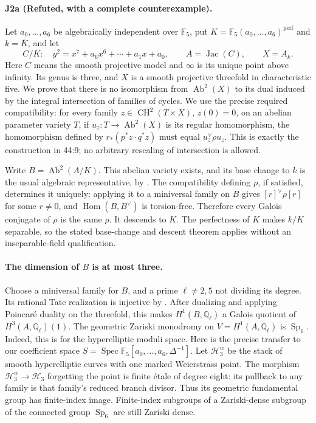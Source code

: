 \paragraph{J2a (Refuted, with a complete counterexample).}
Let $a_0,\ldots,a_6$ be algebraically independent over $\mathbb F_5$,
put $K=\mathbb F_5(a_0,\ldots,a_6)^{\mathrm{perf}}$ and
$k=\overline K$, and let
\[
 C/K:\quad y^2=x^7+a_6x^6+\cdots+a_1x+a_0,
 \qquad A=\operatorname{Jac}(C),\qquad X=A_k.
\]
Here $C$ means the smooth projective model and $\infty$ is its
unique point above infinity.  Its genus is three, and $X$ is a
smooth projective threefold in characteristic five.  We prove
that there is no isomorphism from $\operatorname{Ab}^2(X)$ to its
dual induced by the integral intersection of families of cycles.
We use the precise required compatibility: for every family
$z\in\operatorname{CH}^2(T\times X)$, $z(0)=0$, on an abelian
parameter variety $T$, if $u_z:T\to\operatorname{Ab}^2(X)$ is its
regular homomorphism, the homomorphism defined by
$r_*(p^*z\cdot q^*z)$ must equal $u_z^\vee\rho u_z$.
This is exactly the construction in 44:9; no arbitrary rescaling
of intersection is allowed.

Write $B=\operatorname{Ab}^2(A/K)$.  This abelian variety exists,
and its base change to $k$ is the usual algebraic representative,
by \cite[Theorem 5.10, pp.~25--26; Theorem 6.1, pp.~26--27]{DGJ_ACMVFunctor}.
The compatibility defining $\rho$, if satisfied, determines it
uniquely: applying it to a miniversal family on $B$ gives
$[r]^\vee\rho[r]$ for some $r\ne0$, and $\operatorname{Hom}(B,B^\vee)$
is torsion-free.  Therefore every Galois conjugate of $\rho$ is the
same $\rho$.  It descends to $K$.  The perfectness of $K$ makes
$k/K$ separable, so the stated base-change and descent theorem
applies without an inseparable-field qualification.

\paragraph{The dimension of $B$ is at most three.}
Choose a miniversal family for $B$, and a prime $\ell\ne2,5$
not dividing its degree.  Its rational Tate realization is
injective by \cite[Proposition 8.2, p.~31]{DGJ_ACMVFunctor}.
After dualizing and applying Poincaré duality on the threefold,
this makes $H^1(B,\mathbb Q_\ell)$ a Galois quotient of
$H^3(A,\mathbb Q_\ell)(1)$.
The geometric Zariski monodromy on $V=H^1(A,\mathbb Q_\ell)$ is
$\operatorname{Sp}_6$.  Indeed, this is
\cite[Theorem 3.4 and Corollary 3.5, pp.~13--14]{DGJ_AchterPries2006}
for the hyperelliptic moduli space.  Here is the precise transfer to our coefficient space
$S=\operatorname{Spec}\mathbb F_5[a_0,\ldots,a_6,\Delta^{-1}]$.
Let $\mathcal H_3^w$ be the stack of smooth hyperelliptic
curves with one marked Weierstrass point.  The morphism
$\mathcal H_3^w\to\mathcal H_3$ forgetting the point is finite
étale of degree eight: its pullback to any family is that
family's reduced branch divisor.  Thus its geometric fundamental
group has finite-index image.  Finite-index subgroups of a
Zariski-dense subgroup of the connected group
$\operatorname{Sp}_6$ are still Zariski dense.


